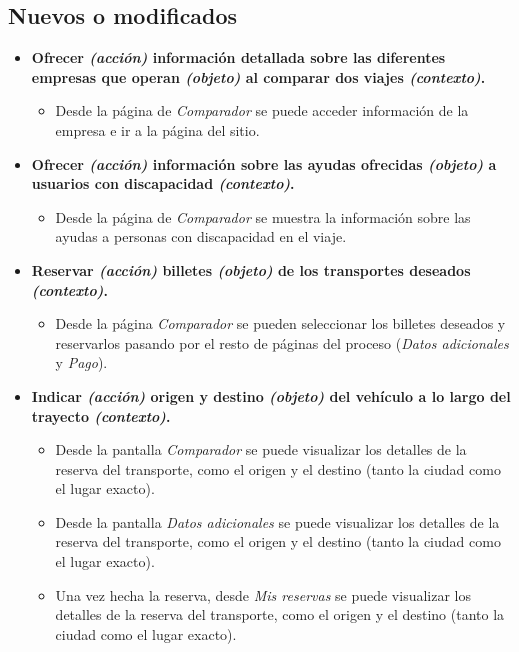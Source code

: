 \subsection*{Nuevos o modificados}

\begin{itemize}
    \item \textbf{Ofrecer \textit{(acción)} información detallada sobre las diferentes empresas que operan
        \textit{(objeto)} al comparar dos viajes \textit{(contexto)}.}
        \begin{itemize}
            \item Desde la página de \textit{Comparador} se puede acceder información de la empresa e
                ir a la página del sitio.
        \end{itemize}
    
    \item \textbf{Ofrecer \textit{(acción)} información sobre las ayudas ofrecidas \textit{(objeto)} a usuarios 
        con discapacidad \textit{(contexto)}.}
        \begin{itemize}
            \item Desde la página de \textit{Comparador} se muestra la información sobre las ayudas a personas
                con discapacidad en el viaje.
        \end{itemize}
    
    \item \textbf{Reservar \textit{(acción)} billetes \textit{(objeto)} de los transportes deseados \textit{(contexto)}.} 
        \begin{itemize}
            \item Desde la página \textit{Comparador} se pueden seleccionar los billetes deseados y reservarlos pasando por el 
                resto de páginas del proceso (\textit{Datos adicionales} y \textit{Pago}).
        \end{itemize}

    \item \textbf{Indicar \textit{(acción)} origen y destino \textit{(objeto)} del vehículo a lo largo del trayecto
        \textit{(contexto)}.}
        \begin{itemize}
            \item Desde la pantalla \textit{Comparador} se puede visualizar los detalles de la reserva del transporte, como el origen y el destino (tanto
                la ciudad como el lugar exacto).
            \item Desde la pantalla \textit{Datos adicionales} se puede visualizar los detalles de la reserva del transporte, como el origen y el destino (tanto
                la ciudad como el lugar exacto).
            \item Una vez hecha la reserva, desde \textit{Mis reservas} se puede visualizar los detalles de la reserva del transporte, como el origen y el destino (tanto
                la ciudad como el lugar exacto).
        \end{itemize}


\end{itemize}
